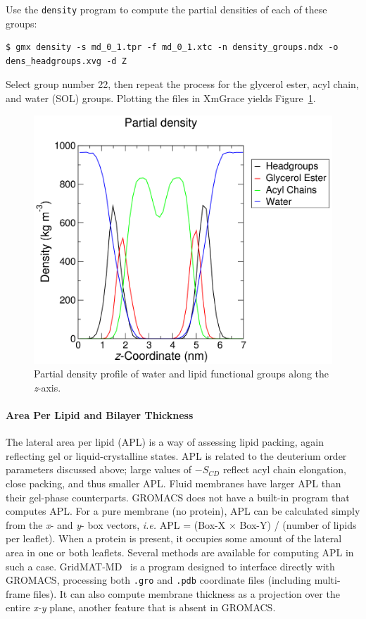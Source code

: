 \documentclass[9pt,tutorial,pubversion]{livecoms}
\begin{document}
Use the \texttt{density} program to compute the partial densities of each of these groups:

\begin{lstlisting}
$ gmx density -s md_0_1.tpr -f md_0_1.xtc -n density_groups.ndx -o dens_headgroups.xvg -d Z
\end{lstlisting}

Select group number 22, then repeat the process for the glycerol ester, acyl chain, and water (SOL) groups. Plotting the files in XmGrace yields Figure~\ref{kalp_dppc_dens_fig}.

\begin{figure}[h!]
\centering
\includegraphics{plot_kalp_dppc_density}
\caption{Partial density profile of water and lipid functional groups along the {\em z}-axis.}
\label{kalp_dppc_dens_fig}
\end{figure}

\paragraph{Area Per Lipid and Bilayer Thickness} \label{kalp_ana_apl}

The lateral area per lipid (APL) is a way of assessing lipid packing, again reflecting gel or liquid-crystalline states. APL is related to the deuterium order parameters discussed above; large values of $-S_{CD}$ reflect acyl chain elongation, close packing, and thus smaller APL. Fluid membranes have larger APL than their gel-phase counterparts. GROMACS does not have a built-in program that computes APL. For a pure membrane (no protein), APL can be calculated simply from the {\em x}- and {\em y}- box vectors, {\em i.e.} APL = (Box-X $\times$ Box-Y) / (number of lipids per leaflet). When a protein is present, it occupies some amount of the lateral area in one or both leaflets. Several methods are available for computing APL in such a case. GridMAT-MD~\cite{Allen2009} is a program designed to interface directly with GROMACS, processing both \texttt{.gro} and \texttt{.pdb} coordinate files (including multi-frame files). It can also compute membrane thickness as a projection over the entire {\em x-y} plane, another feature that is absent in GROMACS.
\end{document}
